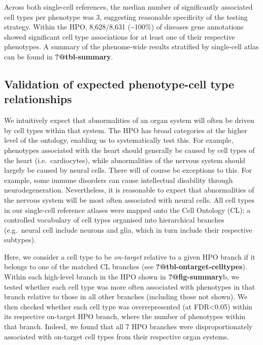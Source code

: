\documentclass[
]{report}
\begin{document}
Across both single-cell references, the median number of significantly
associated cell types per phenotype was 3, suggesting reasonable
specificity of the testing strategy. Within the HPO, 8,628/8,631
(\textasciitilde100\%) of diseases gene annotations showed significant
cell type associations for at least one of their respective phenotypes.
A summary of the phenome-wide results stratified by single-cell atlas
can be found in \textbf{?@tbl-summary}.

\subsection{Validation of expected phenotype-cell type
relationships}\label{validation-of-expected-phenotype-cell-type-relationships}

We intuitively expect that abnormalities of an organ system will often
be driven by cell types within that system. The HPO has broad categories
at the higher level of the ontology, enabling us to systematically test
this. For example, phenotypes associated with the heart should generally
be caused by cell types of the heart (i.e.~cardiocytes), while
abnormalities of the nervous system should largely be caused by neural
cells. There will of course be exceptions to this. For example, some
immune disorders can cause intellectual disability through
neurodegeneration. Nevertheless, it is reasonable to expect that
abnormalities of the nervous system will be most often associated with
neural cells. All cell types in our single-cell reference atlases were
mapped onto the Cell Ontology (CL); a controlled vocabulary of cell
types organised into hierarchical branches (e.g.~neural cell include
neurons and glia, which in turn include their respective subtypes).

Here, we consider a cell type to be \emph{on-target} relative to a given
HPO branch if it belongs to one of the matched CL branches (see
\textbf{?@tbl-ontarget-celltypes}). Within each high-level branch in the
HPO shown in \textbf{?@fig-summary}b, we tested whether each cell type
was more often associated with phenotypes in that branch relative to
those in all other branches (including those not shown). We then checked
whether each cell type was overrepresented (at FDR\textless0.05) within
its respective on-target HPO branch, where the number of phenotypes
within that branch. Indeed, we found that all 7 HPO branches were
disproportionately associated with on-target cell types from their
respective organ systems.

\newpage{}
\end{document}

